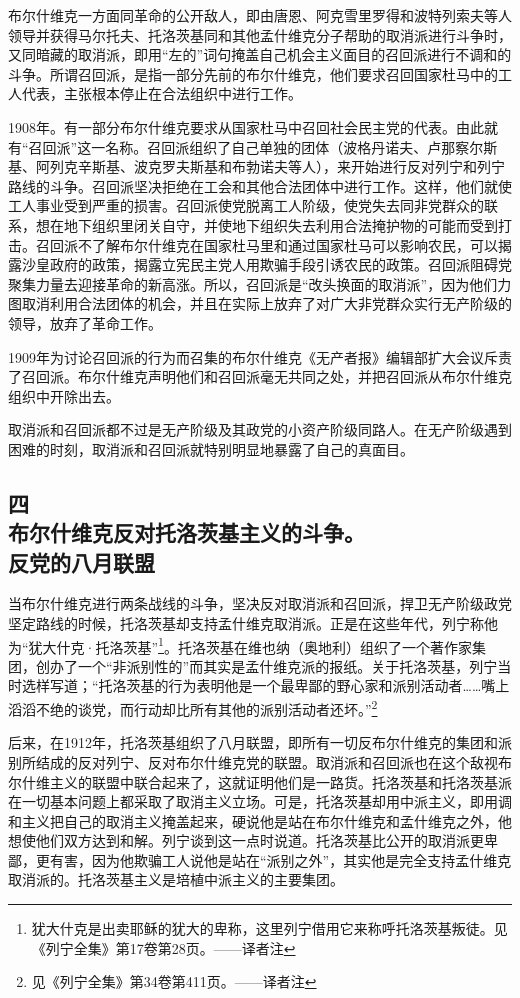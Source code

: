 布尔什维克一方面同革命的公开敌人，即由唐恩、阿克雪里罗得和波特列索夫等人领导并获得马尔托夫、托洛茨基同和其他孟什维克分子帮助的取消派进行斗争时，又同暗藏的取消派，即用“左的”词句掩盖自己机会主义面目的召回派进行不调和的斗争。所谓召回派，是指一部分先前的布尔什维克，他们要求召回国家杜马中的工人代表，主张根本停止在合法组织中进行工作。

1908年。有一部分布尔什维克要求从国家杜马中召回社会民主党的代表。由此就有“召回派”这一名称。召回派组织了自己单独的团体（波格丹诺夫、卢那察尔斯基、阿列克辛斯基、波克罗夫斯基和布勃诺夫等人），来开始进行反对列宁和列宁路线的斗争。召回派坚决拒绝在工会和其他合法团体中进行工作。这样，他们就使工人事业受到严重的损害。召回派使党脱离工人阶级，使党失去同非党群众的联系，想在地下组织里闭关自守，并使地下组织失去利用合法掩护物的可能而受到打击。召回派不了解布尔什维克在国家杜马里和通过国家杜马可以影响农民，可以揭露沙皇政府的政策，揭露立宪民主党人用欺骗手段引诱农民的政策。召回派阻碍党聚集力量去迎接革命的新高涨。所以，召回派是“改头换面的取消派”，因为他们力图取消利用合法团体的机会，并且在实际上放弃了对广大非党群众实行无产阶级的领导，放弃了革命工作。

1909年为讨论召回派的行为而召集的布尔什维克《无产者报》编辑部扩大会议斥责了召回派。布尔什维克声明他们和召回派毫无共同之处，并把召回派从布尔什维克组织中开除出去。

取消派和召回派都不过是无产阶级及其政党的小资产阶级同路人。在无产阶级遇到困难的时刻，取消派和召回派就特别明显地暴露了自己的真面目。


\subsection[四\q 布尔什维克反对托洛茨基主义的斗争。反党的八月联盟]{四\\ 布尔什维克反对托洛茨基主义的斗争。\\ 反党的八月联盟}

当布尔什维克进行两条战线的斗争，坚决反对取消派和召回派，捍卫无产阶级政党坚定路线的时候，托洛茨基却支持孟什维克取消派。正是在这些年代，列宁称他为“犹大什克·托洛茨基”\footnote{犹大什克是出卖耶稣的犹大的卑称，这里列宁借用它来称呼托洛茨基叛徒。见《列宁全集》第17卷第28页。——译者注}。托洛茨基在维也纳（奥地利）组织了一个著作家集团，创办了一个“非派别性的”而其实是孟什维克派的报纸。关于托洛茨基，列宁当时选样写道；“托洛茨基的行为表明他是一个最卑鄙的野心家和派别活动者……嘴上滔滔不绝的谈党，而行动却比所有其他的派别活动者还坏。”\footnote{见《列宁全集》第34卷第411页。——译者注}

后来，在1912年，托洛茨基组织了八月联盟，即所有一切反布尔什维克的集团和派别所结成的反对列宁、反对布尔什维克党的联盟。取消派和召回派也在这个敌视布尔什维主义的联盟中联合起来了，这就证明他们是一路货。托洛茨基和托洛茨基派在一切基本问题上都采取了取消主义立场。可是，托洛茨基却用中派主义，即用调和主义把自己的取消主义掩盖起来，硬说他是站在布尔什维克和孟什维克之外，他想使他们双方达到和解。列宁谈到这一点时说道。托洛茨基比公开的取消派更卑鄙，更有害，因为他欺骗工人说他是站在“派别之外”，其实他是完全支持孟什维克取消派的。托洛茨基主义是培植中派主义的主要集团。

